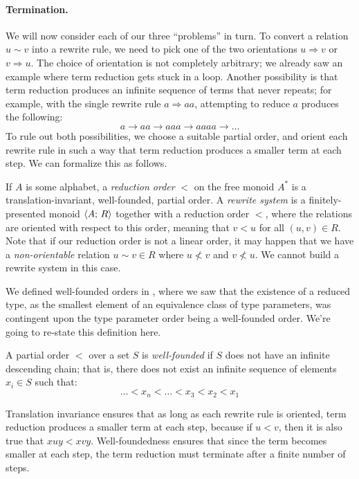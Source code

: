\documentclass[../generics]{subfiles}
\begin{document}
\paragraph{Termination.}  We will now consider each of our three ``problems'' in turn. To convert a relation $u\sim v$ into a rewrite rule, we need to pick one of the two orientations $u\Rightarrow v$ or $v\Rightarrow u$. The choice of orientation is not completely arbitrary; we already saw an example where term reduction gets stuck in a loop. Another possibility is that term reduction produces an infinite sequence of terms that never repeats; for example, with the single rewrite rule $a\Rightarrow aa$, attempting to reduce $a$ produces the following:
\[a\rightarrow aa\rightarrow aaa\rightarrow aaaa\rightarrow\ldots\]
To rule out both possibilities, we choose a suitable partial order, and orient each rewrite rule in such a way that term reduction produces a smaller term at each step. We can formalize this as follows.
\begin{definition}\label{reduction order def}
If $A$ is some alphabet, a \emph{reduction order} $<$ on the free monoid $A^*$ is a translation-invariant, well-founded, partial order. A \emph{rewrite system} is a finitely-presented monoid $\langle A;\,R\rangle$ together with a reduction order $<$, where the relations are oriented with respect to this order, meaning that $v<u$ for all $(u,v)\in R$. Note that if our reduction order is not a linear order, it may happen that we have a \emph{non-orientable} relation $u\sim v\in R$ where $u\not< v$ and $v\not< u$. We cannot build a rewrite system in this case.
\end{definition}
We defined well-founded orders in , where we saw that the existence of a reduced type, as the smallest element of an equivalence class of type parameters, was contingent upon the type parameter order being a well-founded order. We're going to re-state this definition here.
\begin{definition}
A partial order $<$ over a set $S$ is \emph{well-founded} if $S$ does not have an infinite descending chain; that is, there does not exist an infinite sequence of elements $x_i\in S$ such that:
\[\ldots <x_n<\ldots <x_3<x_2<x_1\]
\end{definition}
Translation invariance ensures that as long as each rewrite rule is oriented, term reduction produces a smaller term at each step, because if $u<v$, then it is also true that $xuy<xvy$. Well-foundedness ensures that since the term becomes smaller at each step, the term reduction must terminate after a finite number of steps.
\end{document}
